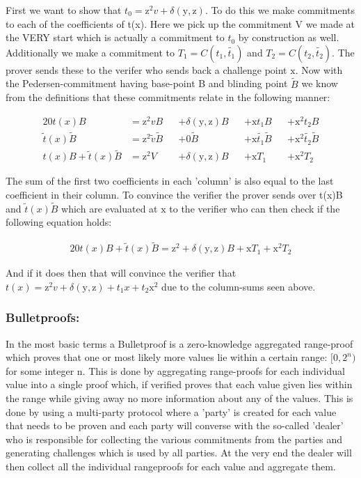 \documentclass{article}
\newcommand{\eq}[1]{\begin{alignat*}{20}#1\end{alignat*}}
\newcommand{\ran}[1]{\mathrm{#1}}
\begin{document}
First we want to show that $t_0 = \ran{z^2}v + \delta(\ran{y},\ran{z})$. To do this we make commitments to each of the coefficients of t(x). Here we pick up the commitment V we made at the VERY start which is actually a commitment to $t_0$ by construction as well. Additionally we make a commitment to $T_1 = C(t_1, \widetilde{t_1})$ and $T_2 = C(t_2, \widetilde{t_2})$. The prover sends these to the verifer who sends back a challenge point $\ran{x}$. Now with the Pedersen-commitment having base-point B and blinding point $\widetilde{B}$ we know from the definitions that these commitments relate in the following manner:

\eq{
	t(x)B &= \ran{z^2}vB &&+ \delta(\ran{y},\ran{z})B &&+ \ran{x}t_1B &&+ \ran{x^2}t_2B \\
	\widetilde{t}(x)\widetilde{B} &= \ran{z^2}\widetilde{v}\widetilde{B} &&+ 0\widetilde{B} &&+ \ran{x}\widetilde{t_1}\widetilde{B} &&+ \ran{x^2}\widetilde{t_2}\widetilde{B}\\
	t(x)B + \widetilde{t}(x)\widetilde{B} &= \ran{z^2}V &&+ \delta(\ran{y},\ran{z})B &&+ \ran{x}T_1 &&+ \ran{x^2}T_2
}

The sum of the first two coefficients in each 'column' is also equal to the last coefficient in their column. To convince the verifier the prover sends over t(x)B and $\widetilde{t}(x)\widetilde{B}$ which are evaluated at $\ran{x}$ to the verifier who can then check if the following equation holds:

\eq{
	t(x)B + \widetilde{t}(x)\widetilde{B} = \ran{z^2} + \delta(\ran{y},\ran{z})B + \ran{x}T_1 + \ran{x^2}T_2
}

And if it does then that will convince the verifier that $t(x) = \ran{z^2}v + \delta(\ran{y},\ran{z}) + t_1x + t_2\ran{x^2}$ due to the column-sums seen above.


\subsubsection{Bulletproofs:}

In the most basic terms a Bulletproof is a zero-knowledge aggregated range-proof which proves that one or most likely more values lie within a certain range: $[0,2^n)$ for some integer n. This is done by aggregating range-proofs for each individual value into a single proof which, if verified proves that each value given lies within the range while giving away no more information about any of the values. This is done by using a multi-party protocol where a 'party' is created for each value that needs to be proven and each party will converse with the so-called 'dealer' who is responsible for collecting the various commitments from the parties and generating challenges which is used by all parties. At the very end the dealer will then collect all the individual rangeproofs for each value and aggregate them. 
\end{document}
